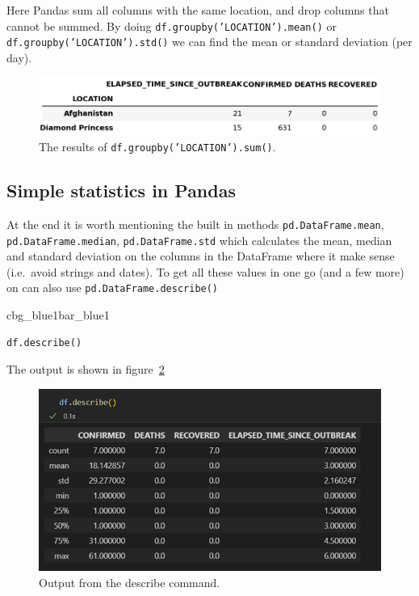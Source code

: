 \documentclass[%
oneside,                 %
final,                   %
10pt]{article}
\newenvironment{_pro_tight}[2]{
   \def\FrameCommand{\color{#2}\vrule width 1mm\normalcolor\colorbox{#1}}
   \FrameRule0.6pt\MakeFramed {\advance\hsize-2mm\FrameRestore}\vskip3mm}
   {\vskip0mm\endMakeFramed}
\newenvironment{pro}[2]{
\bgroup\rmfamily
\fboxsep=0mm\relax
\begin{_pro_tight}{#1}{#2}
\list{}{\parsep=-2mm\parskip=0mm\topsep=0pt\leftmargin=2mm
\rightmargin=2\leftmargin\leftmargin=4pt\relax}
\item\relax}
{\endlist\end{_pro_tight}\egroup}
\begin{document}
Here Pandas sum all columns with the same location, and drop columns that cannot be summed. By doing \texttt{df.groupby('LOCATION').mean()} or \texttt{df.groupby('LOCATION').std()} we can find the mean or standard deviation (per day).

\begin{figure}[!ht]  %
  \centerline{\includegraphics[width=1.0\linewidth]{fig-pandas/group.png}}
  \caption{
  The results of \texttt{df.groupby('LOCATION').sum()}. \label{fig:pandas:group}
  }
\end{figure}

\subsection{Simple statistics in Pandas}
At the end it is worth mentioning the built in methods \texttt{pd.DataFrame.mean}, \texttt{pd.DataFrame.median}, \texttt{pd.DataFrame.std} which calculates the mean, median and standard deviation on the columns in the DataFrame where it make sense (i.e.~avoid strings and dates). To get all these values in one go (and a few more) on can also use \texttt{pd.DataFrame.describe()}


\begin{pro}{cbg_blue1}{bar_blue1}\begin{Verbatim}[numbers=none,fontsize=\fontsize{9pt}{9pt},baselinestretch=0.95,xleftmargin=2mm]
df.describe()

\end{Verbatim}
\end{pro}
\noindent

The output is shown in figure~\ref{fig:pandas:desc}

\begin{figure}[!ht]  %
  \centerline{\includegraphics[width=1.0\linewidth]{fig-pandas/describe.png}}
  \caption{
  Output from the describe command. \label{fig:pandas:desc}
  }
\end{figure}
\end{document}
